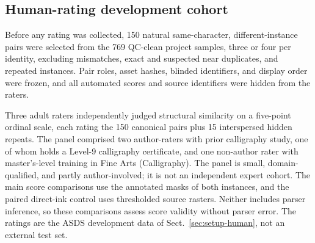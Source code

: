 \subsection{Human-rating development cohort}
\label{sec:data-human}

Before any rating was collected, 150 natural same-character,
different-instance pairs were selected from the 769 QC-clean project samples,
three or four per identity, excluding mismatches, exact and suspected near
duplicates, and repeated instances. Pair roles, asset hashes, blinded
identifiers, and display order were frozen, and all automated scores and
source identifiers were hidden from the raters.

Three adult raters independently judged structural similarity on
a five-point ordinal scale, each rating the 150 canonical pairs plus 15
interspersed hidden repeats. The panel comprised two author-raters
with prior calligraphy study, one of whom holds a Level-9 calligraphy
certificate, and one non-author rater with master's-level training in Fine
Arts (Calligraphy). The panel is small, domain-qualified, and partly
author-involved; it is not an independent expert cohort. The main score
comparisons use the annotated masks of both instances, and the paired
direct-ink control uses thresholded source rasters. Neither includes parser
inference, so these comparisons assess score validity without parser error.
The ratings are the ASDS development data of
Sect.~\ref{sec:setup-human}, not an external test set.
